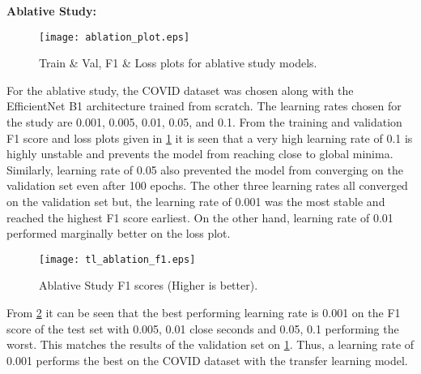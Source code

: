 \documentclass[10pt,twocolumn,letterpaper]{article}
\begin{document}
\textbf{Ablative Study:}
\begin{figure}[t]
  \centering
  \texttt{[image: ablation\_plot.eps]}  
   \caption{Train \& Val, F1 \& Loss plots for ablative study models.}
   \label{fig:ablation_plot}
\end{figure}
For the ablative study, the COVID dataset was chosen along with the EfficientNet B1 architecture 
trained from scratch. The learning rates chosen for the study are 0.001, 0.005, 0.01, 0.05, and 0.1.
From the training and validation F1 score and loss plots given in 
\cref{fig:ablation_plot} it is seen that a very high learning rate of 0.1 is highly unstable and 
prevents the model from reaching close to global minima. Similarly, learning rate of 0.05 also prevented 
the model from converging on the validation set even after 100 epochs. The other three learning 
rates all converged on the validation set but, the learning rate of 0.001 was the most stable 
and reached the highest F1 score earliest. On the other hand, learning rate of 0.01 performed marginally 
better on the loss plot.
\begin{figure}[t]
  \centering
  \texttt{[image: tl\_ablation\_f1.eps]}  
   \caption{Ablative Study F1 scores (Higher is better).}
   \label{fig:ablation}
\end{figure}
From \cref{fig:ablation} it can be seen that the best performing learning rate is 0.001 
on the F1 score of the test set with 0.005, 0.01 close seconds and 0.05, 0.1 performing the worst.
This matches the results of the validation set on \cref{fig:ablation_plot}. Thus, a learning rate of 
0.001 performs the best on the COVID dataset with the transfer learning model.


\clearpage
{\small


}
\end{document}
